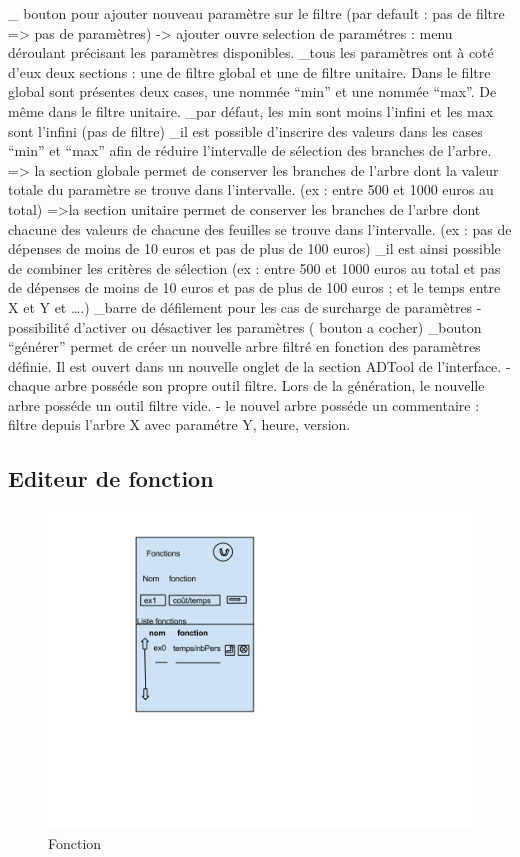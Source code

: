 		_ bouton pour ajouter nouveau paramètre sur le filtre (par default : pas de filtre => pas de paramètres) 
		   -> ajouter ouvre selection de paramétres : menu déroulant précisant les paramètres disponibles.
		_tous les paramètres ont à coté d’eux deux sections : une de filtre global et une de filtre unitaire. Dans le filtre global sont présentes deux cases, une nommée “min” et une nommée “max”. De même dans le filtre unitaire.
		_par défaut, les min sont moins l'infini et les max sont l’infini (pas de filtre)
		_il est possible d’inscrire des valeurs dans les cases “min” et “max” afin de réduire l’intervalle de sélection des branches de l'arbre.
			=> la section globale permet de conserver les branches de l’arbre dont la valeur totale du paramètre se trouve dans l’intervalle. (ex : entre 500 et 1000 euros au total)
			=>la section unitaire permet de conserver les branches de l’arbre dont chacune des valeurs de chacune des feuilles se trouve dans l’intervalle. (ex : pas de dépenses de moins de 10 euros et pas de plus de 100 euros)
		_il est ainsi possible de combiner les critères de sélection (ex : entre 500 et 1000 euros au total et pas de dépenses de moins de 10 euros et pas de plus de 100 euros ; et le temps entre X et Y et ….)
		_barre de défilement pour les cas de surcharge de paramètres
		- possibilité d'activer ou désactiver les paramètres ( bouton a cocher)
		_bouton ``générer'' permet de créer un nouvelle arbre filtré en fonction des paramètres définie. Il est ouvert dans un nouvelle onglet de la section ADTool de l'interface. 
		- chaque arbre posséde son propre outil filtre. Lors de la génération, le nouvelle arbre posséde un outil filtre vide. 
		- le nouvel arbre posséde un commentaire : filtre depuis l'arbre X avec paramétre Y, heure, version.

	\subsection{Editeur de fonction}
		\begin{figure}
			\begin{center}
				\includegraphics[width=1\textwidth]{figure/fonction.png}
			\end{center}
			\caption{Fonction}
			\label{fig:fonction}
		\end{figure}

